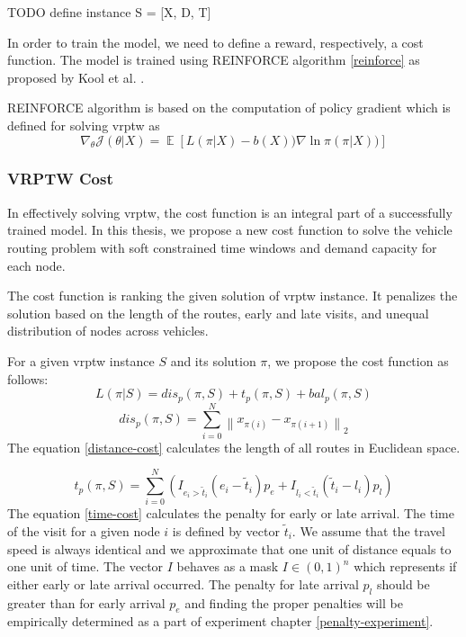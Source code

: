     TODO define instance S = [X, D, T]
    
    In order to train the model, we need to define a reward, respectively, a cost function. The model is trained using REINFORCE algorithm \ref{reinforce} as proposed by Kool et al. \cite{attention-route}.
    
    REINFORCE algorithm is based on the computation of policy gradient which is defined for solving \gls{vrptw} as
    \begin{equation}\label{encoder-attention-score}
        \nabla_{\theta} \mathcal{J}(\theta|X) = \mathop{\mathbb{E}}[ L(\pi|X) - b(X)) \nabla \ln \pi (\pi|X))]
    \end{equation}
    
        \subsubsection{VRPTW Cost}\label{vrptw-rl}
        In effectively solving \gls{vrptw}, the cost function is an integral part of a successfully trained model. In this thesis, we propose a new cost function to solve the vehicle routing problem with soft constrained time windows and demand capacity for each node.
        
        The cost function is ranking the given solution of \gls{vrptw} instance. It penalizes the solution based on the length of the routes, early and late visits, and unequal distribution of nodes across vehicles.
        
        For a given \gls{vrptw} instance $S$ and its solution $\pi$, we propose the cost function as follows:
        \newcommand{\norm}[1]{\left\lVert#1\right\rVert}
        \begin{equation}\label{vrptw-cost}
            L(\pi|S) = dis_p(\pi, S) + t_p(\pi, S) + bal_p(\pi, S)
        \end{equation}
        \begin{equation}\label{distance-cost}
            dis_p(\pi, S) = \sum_{i=0}^N \norm{x_{\pi(i)} - x_{\pi(i+1)}}_2
        \end{equation}
        The equation \ref{distance-cost} calculates the length of all routes in Euclidean space.
        
        \begin{equation}\label{time-cost}
            t_p(\pi, S) = \sum_{i=0}^N (I_{e_i > \widetilde{t}_i} (e_i - \widetilde{t}_i) p_e + I_{l_i < \widetilde{t}_i} (\widetilde{t}_i - l_i) p_l)
        \end{equation}
        The equation \ref{time-cost} calculates the penalty for early or late arrival. The time of the visit for a given node $i$ is defined by vector $\widetilde{t}_i$. We assume that the travel speed is always identical and we approximate that one unit of distance equals to one unit of time. The vector $I$ behaves as a mask $I \in (0, 1)^n$ which represents if either early or late arrival occurred. The penalty for late arrival $p_l$ should be greater than for early arrival $p_e$ and finding the proper penalties will be empirically determined as a part of experiment chapter \ref{penalty-experiment}.
        
